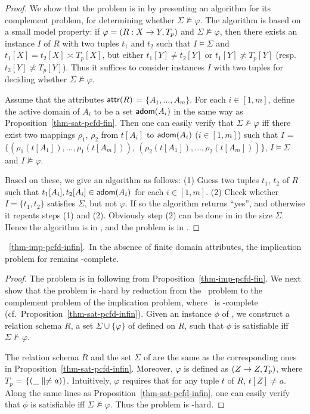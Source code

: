 {\begin{proof}
We show that the problem is in \coNP by presenting an \NP algorithm
for its complement problem, \ie for determining whether
$\Sigma\not\models\varphi$. The algorithm is based on a small model
property: if $\varphi = (R: X \rightarrow Y, T_p)$ and $\Sigma
\not\models\varphi$, then there exists an instance $I$ of $R$ with
two tuples $t_1$ and $t_2$ such that $I\models\Sigma$ and $t_1[X] =
t_2[X] \asymp T_p[X]$, but either $t_1[Y]\ne t_2[Y]$ or
$t_1[Y]\not\asymp T_p[Y]$ (resp. $t_2[Y]\not\asymp T_p[Y]$). Thus it
suffices to consider instances $I$ with two tuples for deciding
whether $\Sigma\not\models\varphi$.

Assume \kwlog that the attributes $\protect\mathsf{attr}(R)$ = $\{A_1,\dots,
A_m\}$. For each $i\in [1, m]$, define the active domain of $A_i$ to
be a set ${\mathsf{adom}}(A_i)$ in the same way as
Proposition~\ref{thm-sat-pcfd-fin}. Then one can easily verify that
$\Sigma\not\models\varphi$ iff there exist two mappings $\rho_1$,
$\rho_2$ from $t[A_i]$ to ${\mathsf{adom}}(A_i)$ ($i\in [1, m]$) such that $I$
= $\{(\rho_1(t[A_1]), \ldots, \rho_1(t[A_m]))$, $(\rho_2(t[A_1]),
\ldots, \rho_2(t[A_m]))\}$, $I \models\Sigma$ and
$I\not\models\varphi$.

Based on these, we give an \NP algorithm as follows: (1) Guess two
tuples $t_1$, $t_2$ of $R$ such that $t_1[A_i],t_2[A_i]
\in{\ensuremath {\mathsf{adom}}}(A_i)$ for each $i \in [1, m]$. (2) Check whether $I =
\{t_1, t_2\}$ satisfies $\Sigma$, but not $\varphi$. If so the
algorithm returns ``yes'', and otherwise it repeats steps (1) and
(2). Obviously step (2) can be done in \PTIME in the size $\Sigma$.
Hence the algorithm is in \NP, and the problem is in \coNP.\eop
\end{proof}


\vspace{2ex} \noindent{}~\ref{thm-imp-pcfd-infin}.~In the
absence of finite domain attributes, the implication problem for
\pCFDs remains \coNP-complete. \eop

\begin{proof}
The problem is in \coNP following from
Proposition~\ref{thm-imp-pcfd-fin}. We next show that the problem is
\coNP-hard by reduction from the \kSAT\ problem to the complement
problem of the implication problem, where \kSAT\ is \NP-complete
(cf.~Proposition~\ref{thm-sat-pcfd-infin}). Given an instance $\phi$
of \kSAT, we construct a relation schema $R$, a set
$\Sigma\cup\{\varphi\}$ of \pCFDs defined on $R$, such that $\phi$
is satisfiable iff $\Sigma\not\models\varphi$.


The relation schema $R$ and the set $\Sigma$ of \pCFDs are the same
as the corresponding ones in Proposition~\ref{thm-sat-pcfd-infin}.
Moreover, $\varphi$ is defined as $(Z \rightarrow Z, T_p)$, where $T_{p}$ =
$\{(\_ \parallel \ne a)\}$. Intuitively, $\varphi$ requires that for any
tuple $t$ of $R$, $t[Z] \ne a$. Along the same lines as
Proposition~\ref{thm-sat-pcfd-infin}, one can easily verify that
$\phi$ is satisfiable iff $\Sigma\not\models\varphi$. Thus the
problem is \coNP-hard. \eop
\end{proof}


}

